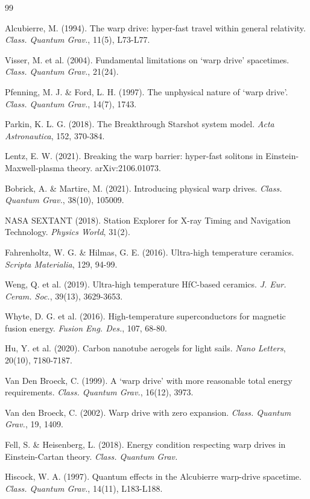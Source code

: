 \documentclass[11pt,a4paper,onecolumn]{article}
\begin{document}
\begin{thebibliography}{99}

 Alcubierre, M. (1994). The warp drive: hyper-fast travel within general relativity. \textit{Class. Quantum Grav.}, 11(5), L73-L77.

 Visser, M. et al. (2004). Fundamental limitations on `warp drive' spacetimes. \textit{Class. Quantum Grav.}, 21(24).

 Pfenning, M. J. \& Ford, L. H. (1997). The unphysical nature of `warp drive'. \textit{Class. Quantum Grav.}, 14(7), 1743.

 Parkin, K. L. G. (2018). The Breakthrough Starshot system model. \textit{Acta Astronautica}, 152, 370-384.

 Lentz, E. W. (2021). Breaking the warp barrier: hyper-fast solitons in Einstein-Maxwell-plasma theory. arXiv:2106.01073.

 Bobrick, A. \& Martire, M. (2021). Introducing physical warp drives. \textit{Class. Quantum Grav.}, 38(10), 105009.

 NASA SEXTANT (2018). Station Explorer for X-ray Timing and Navigation Technology. \textit{Physics World}, 31(2).

 Fahrenholtz, W. G. \& Hilmas, G. E. (2016). Ultra-high temperature ceramics. \textit{Scripta Materialia}, 129, 94-99.

 Weng, Q. et al. (2019). Ultra-high temperature HfC-based ceramics. \textit{J. Eur. Ceram. Soc.}, 39(13), 3629-3653.

 Whyte, D. G. et al. (2016). High-temperature superconductors for magnetic fusion energy. \textit{Fusion Eng. Des.}, 107, 68-80.

 Hu, Y. et al. (2020). Carbon nanotube aerogels for light sails. \textit{Nano Letters}, 20(10), 7180-7187.

 Van Den Broeck, C. (1999). A `warp drive' with more reasonable total energy requirements. \textit{Class. Quantum Grav.}, 16(12), 3973.

 Van den Broeck, C. (2002). Warp drive with zero expansion. \textit{Class. Quantum Grav.}, 19, 1409.

 Fell, S. \& Heisenberg, L. (2018). Energy condition respecting warp drives in Einstein-Cartan theory. \textit{Class. Quantum Grav.}

 Hiscock, W. A. (1997). Quantum effects in the Alcubierre warp-drive spacetime. \textit{Class. Quantum Grav.}, 14(11), L183-L188.


\end{thebibliography}
\end{document}
